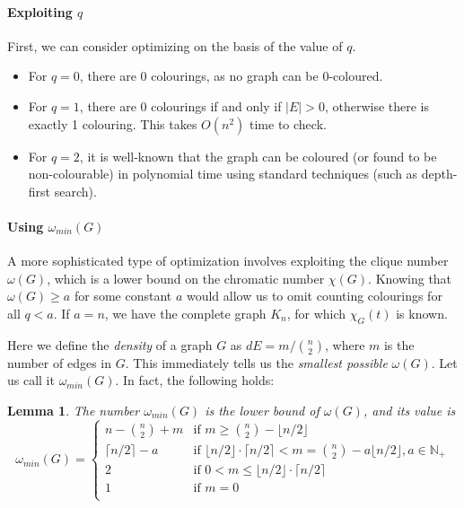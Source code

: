 \documentclass[a4paper]{article}
\newtheorem{lemma}{Lemma}
\begin{document}
\paragraph{Exploiting $q$}
First, we can consider optimizing on the basis of the value of $q$.
\begin{itemize}
\item For $q = 0$, there are 0 colourings, as no graph can be 0-coloured.
\item For $q = 1$, there are 0 colourings if and only if $|E| > 0$, otherwise there is exactly 1 colouring. This takes $O(n^2)$ time to check.
\item For $q = 2$, it is well-known that the graph can be coloured (or found to be non-colourable) in polynomial time using standard techniques (such as depth-first search).
\end{itemize}

\paragraph{Using $\omega_{min}(G)$}
A more sophisticated type of optimization involves exploiting the clique number $\omega(G)$, which is a lower bound on the chromatic number $\chi(G)$. Knowing that $\omega(G) \geq a$ for some constant $a$ would allow us to omit counting colourings for all $q < a$. If $a = n$, we have the complete graph $K_n$, for which $\chi_G(t)$ is known.

Here we define the \emph{density} of a graph $G$ as $dE = m/\binom{n}{2}$, where $m$ is the number of edges in $G$. This immediately tells us the \emph{smallest possible} $\omega(G)$. Let us call it $\omega_{min}(G)$. In fact, the following holds:

\begin{lemma}\label{lemma1}
The number $\omega_{min}(G)$ is the lower bound of $\omega(G)$, and its value is
\[
\omega_{min}(G) = 
\begin{cases}
	  n - \binom{n}{2} + m & \text{if } m \geq \binom{n}{2} - \lfloor n/2 \rfloor \\
	  \lceil n / 2 \rceil - a & \text{if }  \lfloor n / 2 \rfloor \cdot \lceil n / 2 \rceil < m = \binom{n}{2} - a \lfloor n/2 \rfloor, a \in \mathbb{N}_+ \\
	  2 & \text{if } 0 < m \leq \lfloor n / 2 \rfloor \cdot \lceil n / 2 \rceil \\
	  1 & \text{if } m = 0 \\
\end{cases}
\]
\end{lemma}
\end{document}
